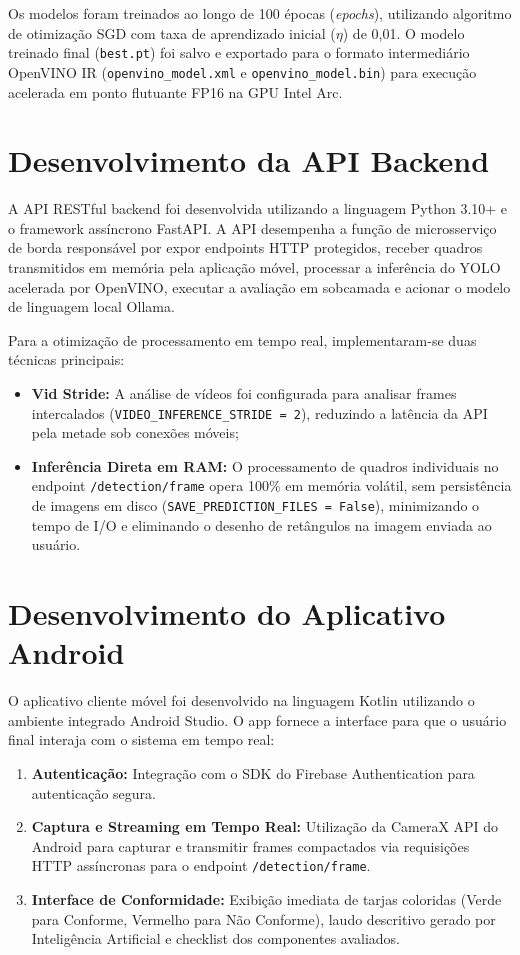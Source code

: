 Os modelos foram treinados ao longo de 100 épocas (\textit{epochs}), utilizando algoritmo de otimização SGD com taxa de aprendizado inicial ($\eta$) de 0,01. O modelo treinado final (\texttt{best.pt}) foi salvo e exportado para o formato intermediário OpenVINO IR (\texttt{openvino\_model.xml} e \texttt{openvino\_model.bin}) para execução acelerada em ponto flutuante FP16 na GPU Intel Arc.

\section{Desenvolvimento da API Backend}
A API RESTful backend foi desenvolvida utilizando a linguagem Python 3.10+ e o framework assíncrono FastAPI. A API desempenha a função de microsserviço de borda responsável por expor endpoints HTTP protegidos, receber quadros transmitidos em memória pela aplicação móvel, processar a inferência do YOLO acelerada por OpenVINO, executar a avaliação em sobcamada e acionar o modelo de linguagem local Ollama.

Para a otimização de processamento em tempo real, implementaram-se duas técnicas principais:
\begin{itemize}
    \item \textbf{Vid Stride:} A análise de vídeos foi configurada para analisar frames intercalados (\texttt{VIDEO\_INFERENCE\_STRIDE = 2}), reduzindo a latência da API pela metade sob conexões móveis;
    \item \textbf{Inferência Direta em RAM:} O processamento de quadros individuais no endpoint \texttt{/detection/frame} opera 100\% em memória volátil, sem persistência de imagens em disco (\texttt{SAVE\_PREDICTION\_FILES = False}), minimizando o tempo de I/O e eliminando o desenho de retângulos na imagem enviada ao usuário.
\end{itemize}

\section{Desenvolvimento do Aplicativo Android}
O aplicativo cliente móvel foi desenvolvido na linguagem Kotlin utilizando o ambiente integrado Android Studio. O app fornece a interface para que o usuário final interaja com o sistema em tempo real:
\begin{enumerate}
    \item \textbf{Autenticação:} Integração com o SDK do Firebase Authentication para autenticação segura.
    \item \textbf{Captura e Streaming em Tempo Real:} Utilização da CameraX API do Android para capturar e transmitir frames compactados via requisições HTTP assíncronas para o endpoint \texttt{/detection/frame}.
    \item \textbf{Interface de Conformidade:} Exibição imediata de tarjas coloridas (Verde para Conforme, Vermelho para Não Conforme), laudo descritivo gerado por Inteligência Artificial e checklist dos componentes avaliados.
\end{enumerate}

